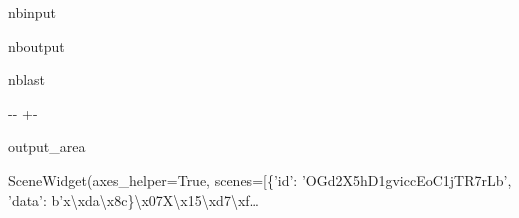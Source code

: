\documentclass[letterpaper,10pt,english]{sphinxmanual}
\begin{document}
\begin{sphinxuseclass}{nbinput}
{
\begin{sphinxVerbatim}[commandchars=\\\{\}]
\llap{\color{nbsphinxin}[13]:\,\hspace{\fboxrule}\hspace{\fboxsep}}
              
             
              
\end{sphinxVerbatim}
}

\end{sphinxuseclass}
\begin{sphinxuseclass}{nboutput}
\begin{sphinxuseclass}{nblast}
{

\kern-\sphinxverbatimsmallskipamount\kern-\baselineskip
\kern+\FrameHeightAdjust\kern-\fboxrule
\vspace{\nbsphinxcodecellspacing}

\begin{sphinxuseclass}{output_area}
\begin{sphinxuseclass}{}


\begin{sphinxVerbatim}[commandchars=\\\{\}]
\llap{\color{nbsphinxout}[13]:\,\hspace{\fboxrule}\hspace{\fboxsep}}SceneWidget(axes\_helper=True, scenes=[\{'id': 'OGd2X5hD1gviccEoC1jTR7rLb', 'data': b'x\textbackslash{}xda\textbackslash{}x8c\}\textbackslash{}x07X\textbackslash{}x15\textbackslash{}xd7\textbackslash{}xf…
\end{sphinxVerbatim}



\end{sphinxuseclass}
\end{sphinxuseclass}
}

\end{sphinxuseclass}
\end{sphinxuseclass}
\end{document}

